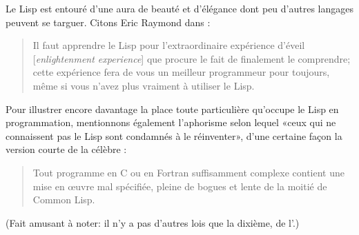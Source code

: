 Le Lisp est entouré d'une aura de beauté et d'élégance dont peu
d'autres langages peuvent se targuer. Citons Eric Raymond dans
:
\begin{quote}
  Il faut apprendre le Lisp pour l'extraordinaire expérience d'éveil
  [\emph{enlightenment experience}] que procure le fait de finalement
  le comprendre; cette expérience fera de vous un meilleur programmeur
  pour toujours, même si vous n'avez plus vraiment à utiliser le Lisp.
\end{quote}

Pour illustrer encore davantage la place toute particulière qu'occupe
le Lisp en programmation, mentionnons également l'aphorisme selon
lequel «ceux qui ne connaissent pas le Lisp sont condamnés à le
réinventer», d'une certaine façon la version courte de la célèbre
: %
\begin{quote}
  Tout programme en C ou en Fortran suffisamment complexe contient une
  mise en œuvre mal spécifiée, pleine de bogues et lente de la moitié
  de Common Lisp.
\end{quote}
(Fait amusant à noter: il n'y a pas d'autres lois que la dixième, de
l'.)

